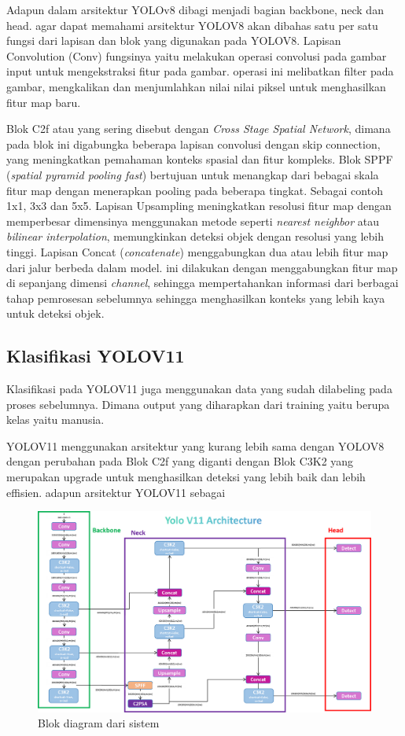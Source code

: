 Adapun dalam arsitektur YOLOv8 dibagi menjadi bagian backbone, neck dan head. agar dapat memahami arsitektur YOLOV8 akan dibahas satu per satu fungsi dari lapisan dan blok yang digunakan pada YOLOV8. Lapisan Convolution (Conv) fungsinya yaitu melakukan operasi convolusi pada gambar input untuk mengekstraksi fitur pada gambar. operasi ini melibatkan filter pada gambar, mengkalikan dan menjumlahkan nilai nilai piksel untuk menghasilkan fitur map baru.

Blok C2f atau yang sering disebut dengan \emph{Cross Stage Spatial Network}, dimana pada blok ini digabungka beberapa lapisan convolusi dengan skip connection, yang meningkatkan pemahaman konteks spasial dan fitur kompleks. Blok SPPF (\emph{spatial pyramid pooling fast}) bertujuan untuk menangkap dari bebagai skala fitur map dengan menerapkan pooling pada beberapa tingkat. Sebagai contoh 1x1, 3x3 dan 5x5. Lapisan Upsampling meningkatkan resolusi fitur map dengan memperbesar dimensinya menggunakan metode seperti \emph{nearest neighbor} atau \emph{bilinear interpolation}, memungkinkan deteksi objek dengan resolusi yang lebih tinggi. Lapisan Concat (\emph{concatenate}) menggabungkan dua atau lebih fitur map dari jalur berbeda dalam model. ini dilakukan dengan menggabungkan fitur map di sepanjang dimensi\emph{ channel}, sehingga mempertahankan  informasi dari berbagai tahap pemrosesan sebelumnya sehingga menghasilkan konteks yang lebih kaya untuk deteksi objek.

\subsection{Klasifikasi YOLOV11}
Klasifikasi pada YOLOV11 juga menggunakan data yang sudah dilabeling pada proses sebelumnya. Dimana output yang diharapkan dari training yaitu berupa kelas yaitu manusia.

YOLOV11 menggunakan arsitektur yang kurang lebih sama dengan YOLOV8 dengan perubahan pada Blok C2f yang diganti dengan Blok C3K2 yang merupakan upgrade untuk menghasilkan deteksi yang lebih baik dan lebih effisien. adapun arsitektur YOLOV11 sebagai 

\begin{figure} [H] \centering
  \includegraphics[scale=0.25]{gambar/yolov11.png}
  \caption{Blok diagram dari sistem}
  \label{fig:rancangan penelitian}
\end{figure}

